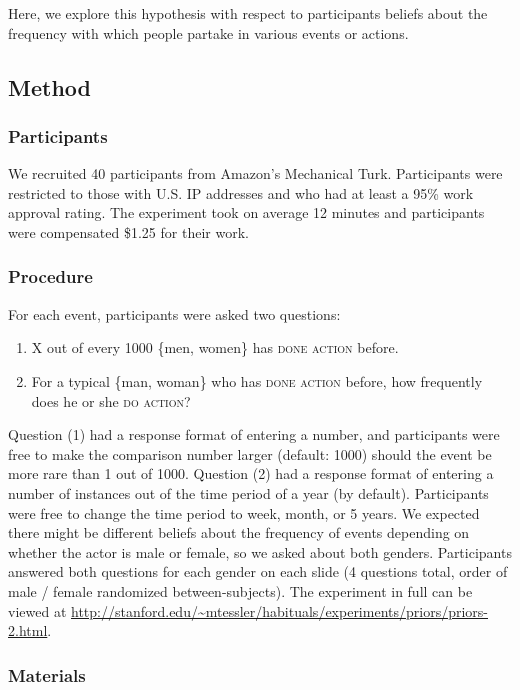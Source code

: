 \documentclass[10pt,letterpaper]{article}
\begin{document}
Here, we explore this hypothesis with respect to participants beliefs about the frequency with which people partake in various events or actions.


\subsection{Method}

\subsubsection{Participants}
We recruited 40 participants from Amazon's Mechanical Turk.
Participants were restricted to those with U.S. IP addresses and who had at least a 95\% work approval rating.
The experiment took on average 12 minutes and participants were compensated \$1.25 for their work.


\subsubsection{Procedure}

For each event, participants were asked two questions:
\begin{enumerate}
\item X out of every 1000 \{men, women\} has \textsc{done action} before.
\item For a typical \{man, woman\} who has \textsc{done action} before, how frequently does he or she \textsc{do action}? 
\end{enumerate}

Question (1) had a response format of entering a number, and participants were free to make the comparison number larger (default: 1000) should the event be more rare than 1 out of 1000.
Question (2) had a response format of entering a number of instances out of the time period of a year (by default). Participants were free to change the time period to week, month, or 5 years.
We expected there might be different beliefs about the frequency of events depending on whether the actor is male or female, so we asked about both genders. Participants answered both questions for each gender on each slide (4 questions total, order of male / female randomized between-subjects).
The experiment in full can be viewed at \url{http://stanford.edu/~mtessler/habituals/experiments/priors/priors-2.html}.

\subsubsection{Materials}
\end{document}
